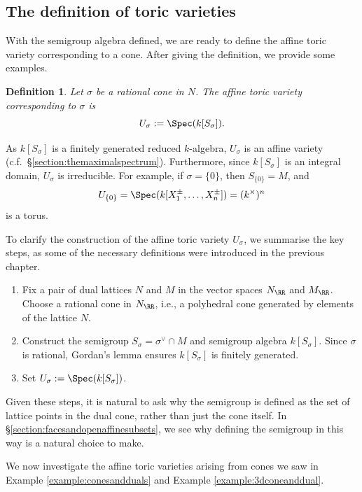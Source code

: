 \documentclass[12pt]{amsart}
\theoremstyle{plain}
\newtheorem{definition}[theorem]{Definition}
\begin{document}
\subsection{The definition of toric varieties}\label{section:affinetoricvarieties}
With the semigroup algebra defined, we are ready to define the affine toric variety corresponding to a cone.
After giving the definition, we provide some examples.

\begin{definition}
Let $\sigma$ be a rational cone in $N$.
The affine toric variety corresponding to $\sigma$ is
$$U_\sigma := \Spec(k[S_\sigma]).$$
\end{definition}

As $k[S_\sigma]$ is a finitely generated reduced $k$-algebra, $U_\sigma$ is an affine variety (c.f.\ \S \ref{section:themaximalspectrum}).
Furthermore, since $k[S_\sigma]$ is an integral domain, $U_\sigma$ is irreducible.
For example, if $\sigma = \{0\}$, then $S_{\{0\}}= M$, and
$$U_{\{0\}} = \Spec(k[X_1^\pm, \ldots, X_n^\pm]) = (k^\times)^n$$
is a torus.

To clarify the construction of the affine toric variety $U_\sigma$, we summarise the key steps, as some of the necessary definitions were introduced in the previous chapter.
\begin{enumerate}
\item Fix a pair of dual lattices $N$ and $M$ in the vector spaces $N_\RR$ and $M_\RR$.
Choose a rational cone in $N_\RR$, i.e., a polyhedral cone generated by elements of the lattice $N$.
\item Construct the semigroup $S_\sigma = \sigma^\vee \cap M$ and semigroup algebra $k[S_\sigma]$.
Since $\sigma$ is rational, Gordan's lemma ensures $k[S_\sigma]$ is finitely generated.
\item Set $U_\sigma := \Spec(k[S_\sigma])$.
\end{enumerate}
Given these steps, it is natural to ask why the semigroup is defined as the set of lattice points in the dual cone, rather than just the cone itself.
In \S \ref{section:facesandopenaffinesubsets}, we see why defining the semigroup in this way is a natural choice to make.

We now investigate the affine toric varieties arising from cones we saw in Example \ref{example:conesandduals} and Example \ref{example:3dconeanddual}.
\end{document}

